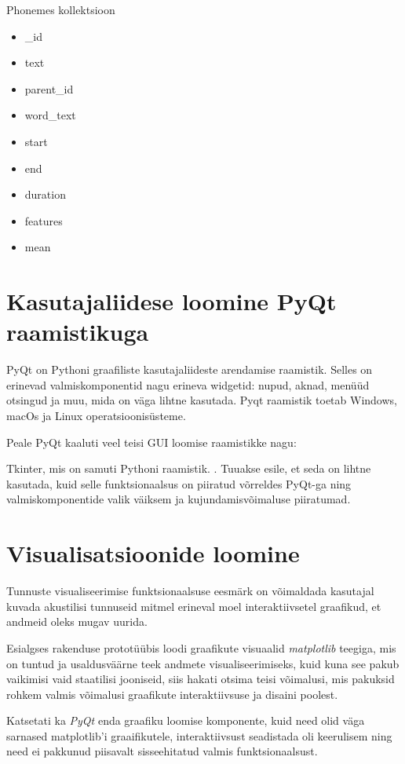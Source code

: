 Phonemes kollektsioon
\begin{itemize}
    \item \_id
    \item text
    \item parent\_id
    \item word\_text
    \item start
    \item end
    \item duration
    \item features
        \item mean
\end{itemize}

\section{Kasutajaliidese loomine PyQt raamistikuga}
PyQt on Pythoni graafiliste kasutajaliideste arendamise raamistik. Selles on erinevad valmiskomponentid nagu erineva widgetid: nupud, aknad, menüüd otsingud ja muu, mida on väga lihtne kasutada. Pyqt raamistik toetab Windows, macOs ja Linux operatsioonisüsteme. \cite{pyqt5}

Peale PyQt kaaluti veel teisi GUI loomise raamistikke nagu:

Tkinter, mis on samuti Pythoni raamistik. \cite{tkinter}. Tuuakse esile, et seda on lihtne kasutada, kuid selle funktsionaalsus on piiratud võrreldes PyQt-ga ning valmiskomponentide valik väiksem ja kujundamisvõimaluse piiratumad.

\section{Visualisatsioonide loomine}

Tunnuste visualiseerimise funktsionaalsuse eesmärk on võimaldada kasutajal kuvada akustilisi tunnuseid mitmel erineval moel interaktiivsetel graafikud, et andmeid oleks mugav uurida.

Esialgses rakenduse prototüübis loodi graafikute visuaalid \textit{matplotlib} teegiga, mis on tuntud ja usaldusväärne teek andmete visualiseerimiseks, kuid kuna see pakub vaikimisi vaid staatilisi jooniseid, siis hakati otsima teisi võimalusi, mis pakuksid rohkem valmis võimalusi graafikute interaktiivsuse ja disaini poolest. 

 Katsetati ka \textit{PyQt} enda graafiku loomise komponente, kuid need olid väga sarnased matplotlib'i graaifikutele, interaktiivsust seadistada oli keerulisem ning need ei pakkunud piisavalt sisseehitatud valmis funktsionaalsust.

